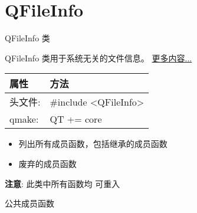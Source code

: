 \chapter{QFileInfo}

QFileInfo 类

QFileInfo 类用于系统无关的文件信息。
\href{https://github.com/JackLovel/QtDocumentCN/blob/master/Src/F/QFileInfo/QFileInfo.md#%E8%AF%A6%E7%BB%86%E6%8F%8F%E8%BF%B0}{
  更多内容...} 

\begin{tabular}{|l|l|}
\hline
属性 &	方法\\
\hline
头文件:& 	\#include <QFileInfo>\\
\hline
qmake:& 	QT += core\\
\hline
\end{tabular}

\begin{itemize}
\item 列出所有成员函数，包括继承的成员函数
\item 废弃的成员函数
\end{itemize}

\textbf{注意}: 此类中所有函数均 可重入

\splitLine

公共成员函数

